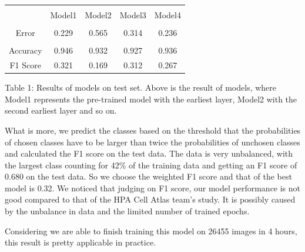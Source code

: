 \documentclass{article}
\begin{document}
\begin{table}[ht]
\centering

\begin{tabular}{|c|c|c|c|c|}
    \hline\\
     &Model1 & Model2&Model3&Model4 \\
     \hline\\
     Error&0.229&0.565&0.314&0.236\\
     \hline\\
     Accuracy&0.946&0.932&0.927&0.936\\
      \hline
     F1 Score&0.321&0.169&0.312&0.267\\
     \hline
\end{tabular}

{\raggedright Table 1: Results of models on test set. Above is the result of models, where Model1 represents the pre-trained model with the earliest layer, Model2 with the second earliest layer and so on. \par}

\label{table:1}
\end{table}

What is more, we predict the classes based on the threshold that the probabilities of chosen classes have to be larger than twice the probabilities of unchosen classes and calculated the F1 score on the test data. The data is very unbalanced, with the largest class counting for 42\% of the training data and getting an F1 score of 0.680 on the test data. So we choose the weighted F1 score and that of the best model is 0.32. We noticed that judging on F1 score, our model performance is not good compared to that of the HPA Cell Atlas team's study. It is possibly caused by the unbalance in data and the limited number of trained epochs.

Considering we are able to finish training this model on 26455 images in 4 hours, this result is pretty applicable in practice.
\end{document}
